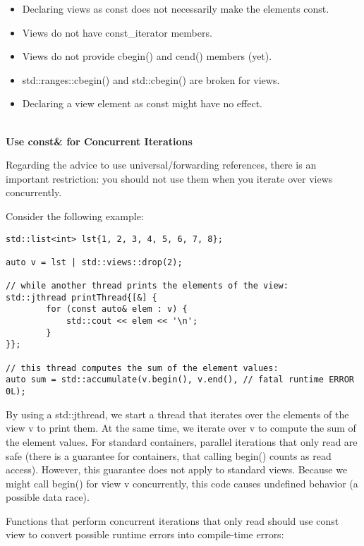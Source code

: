 \begin{itemize}
\item
Declaring views as const does not necessarily make the elements const.

\item
Views do not have const\_iterator members.

\item
Views do not provide cbegin() and cend() members (yet).

\item
std::ranges::cbegin() and std::cbegin() are broken for views.

\item
Declaring a view element as const might have no effect.
\end{itemize}

\noindent
\hspace*{\fill} \\ %
\textbf{Use const\& for Concurrent Iterations}

Regarding the advice to use universal/forwarding references, there is an important restriction: you should not use them when you iterate over views concurrently.

Consider the following example:

\begin{lstlisting}[style=styleCXX]
std::list<int> lst{1, 2, 3, 4, 5, 6, 7, 8};

auto v = lst | std::views::drop(2);

// while another thread prints the elements of the view:
std::jthread printThread{[&] {
		for (const auto& elem : v) {
			std::cout << elem << '\n';
		}
}};

// this thread computes the sum of the element values:
auto sum = std::accumulate(v.begin(), v.end(), // fatal runtime ERROR
0L);
\end{lstlisting}

By using a std::jthread, we start a thread that iterates over the elements of the view v to print them. At the same time, we iterate over v to compute the sum of the element values. For standard containers, parallel iterations that only read are safe (there is a guarantee for containers, that calling begin() counts as read access). However, this guarantee does not apply to standard views. Because we might call begin() for view v concurrently, this code causes undefined behavior (a possible data race).

Functions that perform concurrent iterations that only read should use const view to convert possible runtime errors into compile-time errors:


